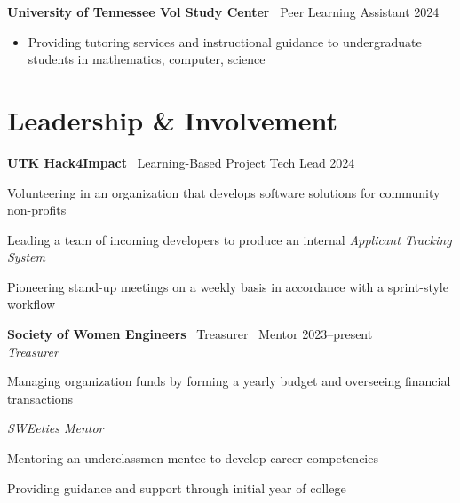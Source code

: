 \documentclass[11pt,a4paper]{article}
\begin{document}
\noindent
\textbf{University of Tennessee Vol Study Center} \textbar\ Peer Learning Assistant \hfill 2024 \vspace{-4pt}
\begin{itemize}[leftmargin=*, topsep=0pt, itemsep=0pt, partopsep=0pt, parsep=0pt]
  \small
  \item Providing tutoring services and instructional guidance to undergraduate students in mathematics, computer, science
\end{itemize}
\vspace{-4pt}

\section*{Leadership \& Involvement}

\noindent
\textbf{UTK Hack4Impact} \textbar\ Learning-Based Project Tech Lead \hfill 2024 \vspace{-4pt}
\begin{itemize}[leftmargin=*, topsep=0pt, itemsep=1pt, partopsep=0pt, parsep=0pt]
  {\small
  \item Volunteering in an organization that develops software solutions for community non-profits
  \item Leading a team of incoming developers to produce an internal \textit{Applicant Tracking System}
  \item Pioneering stand-up meetings on a weekly basis in accordance with a sprint-style workflow
  }
\end{itemize}
\vspace{-5pt}

\noindent
\textbf{Society of Women Engineers} \textbar\ Treasurer \textbar\ Mentor \hfill 2023--present \\ [-1pt]
\noindent\textit{Treasurer} \vspace{-6pt}
\begin{itemize}[leftmargin=*, topsep=0pt, itemsep=1pt, partopsep=0pt, parsep=0pt]
  {\small
  \item Managing organization funds by forming a yearly budget and overseeing financial transactions
  }
\end{itemize}
\vspace{-5pt}

\textit{SWEeties Mentor} \vspace{-6pt}

\begin{itemize}[leftmargin=*, topsep=0pt, itemsep=1pt, partopsep=0pt, parsep=0pt]
  {\small
  \item Mentoring an underclassmen mentee to develop career competencies
  \item Providing guidance and support through initial year of college
  }
\end{itemize}
\vspace{-5pt}
\end{document}
